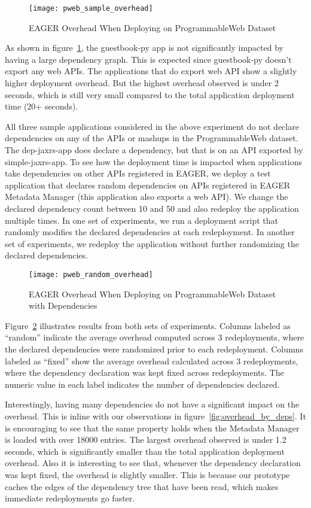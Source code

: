 \begin{figure}
\centering
\texttt{[image: pweb\_sample\_overhead]}
\caption{EAGER Overhead When Deploying on ProgrammableWeb Dataset}
\label{fig:pweb_sample_overhead}
\end{figure}

As shown in figure~\ref{fig:pweb_sample_overhead}, the guestbook-py app is not significantly impacted by having a large dependency graph. This is
expected since guestbook-py doesn't export any web APIs. The applications that do export web API show a slightly higher deployment overhead. 
But the highest overhead observed is under 2 seconds, which is still very small compared
to the total application deployment time (20+ seconds). 

All three sample applications considered in the above experiment do not declare dependencies on any of the APIs or mashups in the ProgrammableWeb
dataset. The dep-jaxrs-app does declare a dependency, but that is on an API exported by simple-jaxrs-app. To see how the deployment time is impacted
when applications take dependencies on other APIs registered in EAGER, we deploy a test application that declares random dependencies on APIs
registered in EAGER Metadata Manager (this application also exports a web API). We change the declared dependency count between 
10 and 50 and also redeploy the application multiple times.
In one set of experiments, we run a deployment script that randomly modifies the declared dependencies at each redeployment. In another set of 
experiments, we redeploy the application without further randomizing the declared dependencies.

\begin{figure}
\centering
\texttt{[image: pweb\_random\_overhead]}
\caption{EAGER Overhead When Deploying on ProgrammableWeb Dataset with Dependencies}
\label{fig:pweb_random_overhead}
\end{figure}

Figure~\ref{fig:pweb_random_overhead} illustrates results from both sets of experiments. Columns labeled as ``random'' indicate the average overhead
computed across 3 redeployments, where the declared dependencies were randomized prior to each redeployment. Columns labeled as ``fixed'' show
the average overhead calculated across 3 redeployments, where the dependency declaration was kept fixed across redeployments. The numeric value
in each label indicates the number of dependencies declared.

Interestingly, having many dependencies do not have a significant impact on the overhead. This is inline with our observations in figure~\ref{fig:overhead_by_deps}.
It is encouraging to see that the same property holds when the Metadata Manager is loaded with over 18000 entries. 
The largest overhead observed is under 1.2 seconds, which is significantly smaller than the total application deployment overhead.
Also it is interesting to see that, whenever the dependency declaration was kept fixed, the overhead is slightly smaller. This is because our prototype caches
the edges of the dependency tree that have been read, which makes immediate redeployments go faster.

